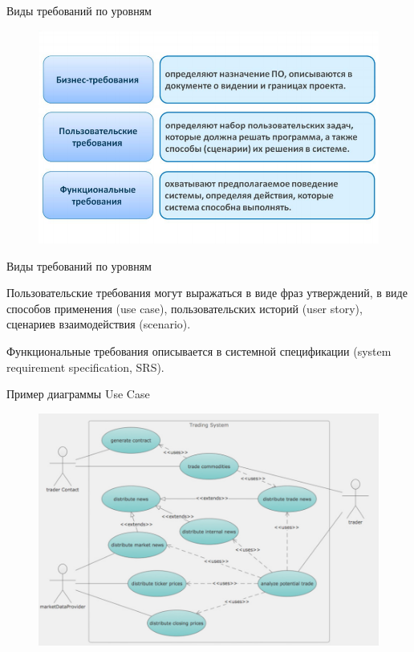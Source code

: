 \documentclass{beamer}
\begin{document}
\begin{frame}[t]{Виды требований по уровням}
\begin{figure}[h]
\centering
\includegraphics[scale=0.5]{images/lec02-pic04.png}
\end{figure}
\end{frame} 

\begin{frame}[t]{Виды требований по уровням}
\begin{block}{Пользовательские требования}
могут выражаться в виде фраз утверждений, в виде способов применения (use case),
пользовательских историй (user story), сценариев взаимодействия (scenario).
\end{block}
\begin{block}{Функциональные требования}
описывается в системной спецификации (system requirement specification, SRS).
\end{block}
\end{frame}

\begin{frame}[t]{Пример диаграммы Use Case}
\begin{figure}[h]
\centering
\includegraphics[scale=0.4]{images/lec02-pic04-02.png}
\end{figure}
\end{frame}
   
\end{document}
